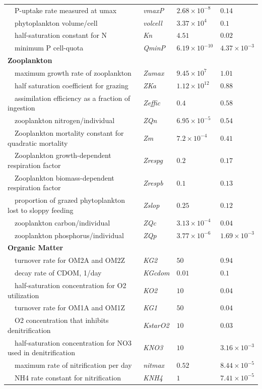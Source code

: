 \documentclass[review]{elsarticle}\usepackage[]{graphicx}\usepackage[]{color}
\begin{document}
\begin{table}[!tbp]
{\begin{center}
\begin{tabular}{llll}
~~P-uptake rate measured at umax&\textit{vmaxP}&$2.68\times 10^{-8}$&$0.14$\tabularnewline
~~phytoplankton volume/cell&\textit{volcell}&$3.37\times 10^{4}$&$0.1$\tabularnewline
~~half-saturation constant for N&\textit{Kn}&$4.51$&$0.02$\tabularnewline
~~minimum P cell-quota&\textit{QminP}&$6.19\times 10^{-10}$&$4.37\times 10^{-3}$\tabularnewline
\hline
{\bfseries Zooplankton}&&&\tabularnewline
~~maximum growth rate of zooplankton&\textit{Zumax}&$9.45\times 10^{7}$&$1.01$\tabularnewline
~~half saturation coefficient for grazing&\textit{ZKa}&$1.12\times 10^{12}$&$0.88$\tabularnewline
~~assimilation efficiency as a fraction of ingestion&\textit{Zeffic}&$0.4$&$0.58$\tabularnewline
~~zooplankton nitrogen/individual&\textit{ZQn}&$6.95\times 10^{-5}$&$0.54$\tabularnewline
~~Zooplankton mortality constant for quadratic mortality&\textit{Zm}&$7.2\times 10^{-4}$&$0.41$\tabularnewline
~~Zooplankton growth-dependent respiration factor&\textit{Zrespg}&$0.2$&$0.17$\tabularnewline
~~Zooplankton biomass-dependent respiration factor&\textit{Zrespb}&$0.1$&$0.13$\tabularnewline
~~proportion of grazed phytoplankton lost to sloppy feeding&\textit{Zslop}&$0.25$&$0.12$\tabularnewline
~~zooplankton carbon/individual&\textit{ZQc}&$3.13\times 10^{-4}$&$0.04$\tabularnewline
~~zooplankton phosphorus/individual&\textit{ZQp}&$3.77\times 10^{-6}$&$1.69\times 10^{-3}$\tabularnewline
\hline
{\bfseries Organic Matter}&&&\tabularnewline
~~turnover rate for OM2A and OM2Z&\textit{KG2}&$50$&$0.94$\tabularnewline
~~decay rate of CDOM, 1/day&\textit{KGcdom}&$0.01$&$0.1$\tabularnewline
~~half-saturation concentration for O2 utilization&\textit{KO2}&$10$&$0.04$\tabularnewline
~~turnover rate for OM1A and OM1Z&\textit{KG1}&$50$&$0.04$\tabularnewline
~~O2 concentration that inhibits denitrification&\textit{KstarO2}&$10$&$0.03$\tabularnewline
~~half-saturation concentration for NO3 used in denitrification&\textit{KNO3}&$10$&$3.16\times 10^{-3}$\tabularnewline
~~maximum rate of nitrification per day&\textit{nitmax}&$0.52$&$8.44\times 10^{-5}$\tabularnewline
~~NH4 rate constant for nitrification&\textit{KNH4}&$1$&$7.41\times 10^{-5}$\tabularnewline
\hline
\end{tabular}\end{center}}
\end{table}
\end{document}
